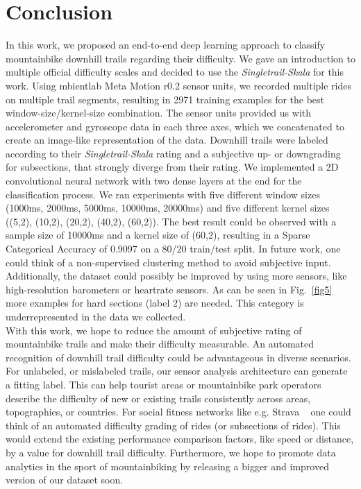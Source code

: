 \documentclass[runningheads]{llncs}
\begin{document}
\section{Conclusion}
In this work, we proposed an end-to-end deep learning approach to classify mountainbike downhill trails regarding their difficulty. 
We gave an introduction to multiple official difficulty scales and decided to use the \textit{Singletrail-Skala} for this work.
Using mbientlab Meta Motion r0.2 sensor units, we recorded multiple rides on multiple trail segments, resulting in 2971 training examples for the best window-size/kernel-size combination.
The sensor units provided us with accelerometer and gyroscope data in each three axes, which we concatenated to create an image-like representation of the data.
Downhill trails were labeled according to their \textit{Singletrail-Skala} rating and a subjective up- or downgrading for subsections, that strongly diverge from their rating.
We implemented a 2D convolutional neural network with two dense layers at the end for the classification process.
We ran experiments with five different window sizes (1000ms, 2000ms, 5000ms, 10000ms, 20000ms) and five different kernel sizes ((5,2), (10,2), (20,2), (40,2), (60,2)).
The best result could be observed with a sample size of 10000ms and a kernel size of (60,2), resulting in a Sparse Categorical Accuracy of 0.9097 on a 80/20 train/test split. 
In future work, one could think of a non-supervised clustering method to avoid subjective input.
Additionally, the dataset could possibly be improved by using more sensors, like high-resolution barometers or heartrate sensors.
As can be seen in Fig.~\ref{fig5} more examples for hard sections (label 2) are needed.
This category is underrepresented in the data we collected.
\\
With this work, we hope to reduce the amount of subjective rating of mountainbike trails and make their difficulty measurable.
An automated recognition of downhill trail difficulty could be advantageous in diverse scenarios.
For unlabeled, or mislabeled trails, our sensor analysis architecture can generate a fitting label.
This can help tourist areas or mountainbike park operators describe the difficulty of new or existing trails consistently across areas, topographies, or countries.
For social fitness networks like e.g. Strava ~\cite{strava} one could think of an automated difficulty grading of rides (or subsections of rides).
This would extend the existing performance comparison factors, like speed or distance, by a value for downhill trail difficulty.
Furthermore, we hope to promote data analytics in the sport of mountainbiking by releasing a bigger and improved version of our dataset soon.




\end{document}
